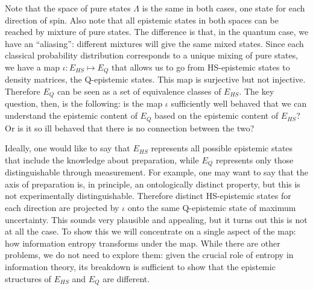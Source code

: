 \documentclass[twocolumn,prl,floatfix,superscriptaddress]{revtex4-2}
\begin{document}
Note that the space of pure states $\Lambda$ is the same in both cases, one state for each direction of spin. Also note that all epistemic states in both spaces can be reached by mixture of pure states. The difference is that, in the quantum case, we have an ``aliasing'': different mixtures will give the same mixed states. Since each classical probability distribution corresponds to a unique mixing of pure states, we have a map $\iota : E_{HS} \mapsto E_{Q}$ that allows us to go from HS-epistemic states to density matrices, the Q-epistemic states. This map is surjective but not injective. Therefore $E_{Q}$ can be seen as a set of equivalence classes of $E_{HS}$. The key question, then, is the following: is the map $\iota$ sufficiently well behaved that we can understand the epistemic content of $E_{Q}$ based on the epistemic content of $E_{HS}$? Or is it so ill behaved that there is no connection between the two?

Ideally, one would like to say that $E_{HS}$ represents all possible epistemic states that include the knowledge about preparation, while $E_{Q}$ represents only those distinguishable through measurement. For example, one may want to say that the axis of preparation is, in principle, an ontologically distinct property, but this is not experimentally distinguishable. Therefore distinct HS-epistemic states for each direction are projected by $\iota$ onto the same Q-epistemic state of maximum uncertainty. This sounds very plausible and appealing, but it turns out this is not at all the case. To show this we will concentrate on a single aspect of the map: how information entropy transforms under the map. While there are other problems, we do not need to explore them: given the crucial role of entropy in information theory, its breakdown is sufficient to show that the epistemic structures of $E_{HS}$ and $E_{Q}$ are different.
\end{document}
